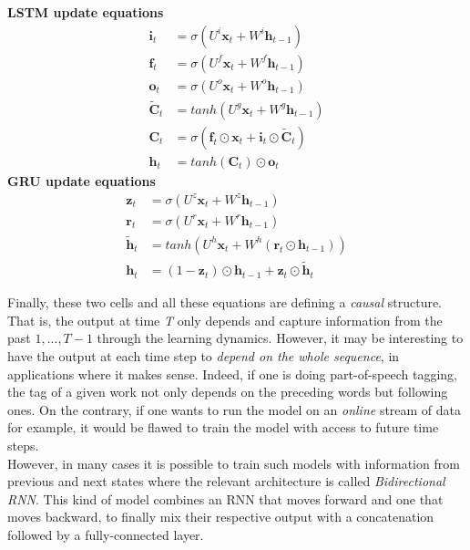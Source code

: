 \begin{multicols}{2}
 \centering
 \textbf{LSTM update equations}
 \begin{equation*}
  \begin{aligned}
   \bm{i}_t &= \sigma(U^i\bm{x}_t + W^i\bm{h}_{t-1}) \\
   \bm{f}_t &= \sigma(U^f\bm{x}_t + W^f\bm{h}_{t-1}) \\
   \bm{o}_t &= \sigma(U^o\bm{x}_t + W^o\bm{h}_{t-1}) \\
   \bm{\tilde{C}}_t &= tanh(U^g\bm{x}_t + W^g\bm{h}_{t-1}) \\
   \bm{C}_t &= \sigma(\bm{f}_t \odot \bm{x}_t + \bm{i}_t \odot \bm{\tilde{C}}_t) \\
   \bm{h}_t &= tanh(\bm{C}_t) \odot \bm{o}_t
  \end{aligned}
 \end{equation*}\columnbreak
 \vfill
 \textbf{GRU update equations}
 \begin{equation*}
  \begin{aligned}
   \bm{z}_t &= \sigma(U^z\bm{x}_t + W^z\bm{h}_{t-1}) \\
   \bm{r}_t &= \sigma(U^r\bm{x}_t + W^r\bm{h}_{t-1}) \\
   \bm{\tilde{h}}_t &= tanh(U^h\bm{x}_t + W^h(\bm{r}_t \odot \bm{h}_{t-1})) \\
   \bm{h}_t &= (1-\bm{z}_t) \odot \bm{h}_{t-1} + \bm{z}_t \odot \bm{\tilde{h}}_t
  \end{aligned}
 \end{equation*}
\end{multicols}

Finally, these two cells and all these equations are defining a \emph{causal} structure. That is, the output at time \emph{T} only depends and capture information from the past $1, ..., T-1$ through the learning dynamics. However, it may be interesting to have the output at each time step to \emph{depend on the whole sequence}, in applications where it makes sense. Indeed, if one is doing part-of-speech tagging, the tag of a given work not only depends on the preceding words but following ones. On the contrary, if one wants to run the model on an \textit{online} stream of data for example, it would be flawed to train the model with access to future time steps. \\

However, in many cases it is possible to train such models with information from previous and next states where the relevant architecture is called \emph{Bidirectional RNN}. This kind of model combines an RNN that moves forward and one that moves backward, to finally mix their respective output with a concatenation followed by a fully-connected layer. \\

